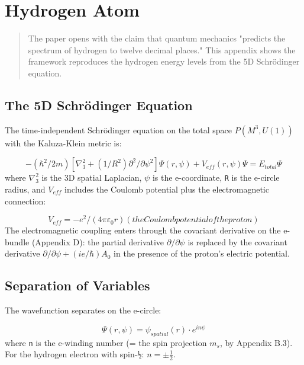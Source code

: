 \documentclass[aps,prd,preprint,superscriptaddress,longbibliography,floatfix]{revtex4-2}
\theoremstyle{remark}
\begin{document}
\section{Hydrogen Atom}


\begin{quote}
The paper opens with the claim that quantum mechanics "predicts the spectrum
of hydrogen to twelve decimal places." This appendix shows the framework
reproduces the hydrogen energy levels from the 5D Schr\"{o}dinger equation.
\end{quote}



\subsection{The 5D Schr\"{o}dinger Equation}

The time-independent Schr\"{o}dinger equation on the total space $P(M^{3}, U(1))$ with the Kaluza-Klein metric is:


\begin{equation}
    -(\hbar^{2}/2m)[\nabla^{2}_{3} + (1/R^{2})\partial^{2}/\partial\psi^{2}] \Psi(r, \psi) + V_{eff}(r, \psi) \Psi = E_{total} \Psi
\end{equation}
where $\nabla^{2}_{3}$ is the 3D spatial Laplacian, $\psi$ is the e-coordinate, \texttt{R} is the e-circle radius, and $V_{eff}$ includes the Coulomb potential plus the electromagnetic connection:


\begin{equation}
    V_{eff} = -e^{2}/(4\pi\varepsilon_{0}r) (the Coulomb potential of the proton)
\end{equation}
The electromagnetic coupling enters through the covariant derivative on the e-bundle (Appendix D): the partial derivative $\partial/\partial\psi$ is replaced by the covariant derivative $\partial/\partial\psi + (ie/\hbar)A_{0}$ in the presence of the proton's electric potential.


\subsection{Separation of Variables}

The wavefunction separates on the e-circle:


\begin{equation}
    \Psi(r, \psi) = \psi_{spatial}(r) \cdot e^{in\psi}
\end{equation}
where \texttt{n} is the e-winding number (= the spin projection $m_{s}$, by Appendix B.3). For the hydrogen electron with spin-\texttt{½}: $n = \pm\tfrac{1}{2}$.
\end{document}
